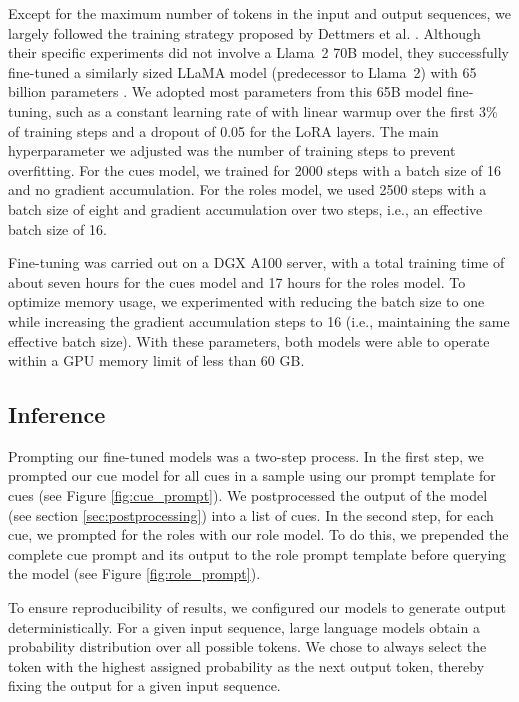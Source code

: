 \documentclass[11pt,a4paper]{article}
\begin{document}
Except for the maximum number of tokens in the input and output sequences, we largely followed the training strategy proposed by Dettmers et al. \cite{Dettmers2023}.
Although their specific experiments did not involve a Llama~2 70B model, they successfully fine-tuned a similarly sized LLaMA model (predecessor to Llama~2) with 65 billion parameters \cite{Touvron2023a}.
We adopted most parameters from this 65B model fine-tuning, such as a constant learning rate of  with linear warmup over the first 3\% of training steps and a dropout of 0.05 for the LoRA layers.
The main hyperparameter we adjusted was the number of training steps to prevent overfitting.
For the cues model, we trained for 2000 steps with a batch size of 16 and no gradient accumulation.
For the roles model, we used 2500 steps with a batch size of eight and gradient accumulation over two steps, i.e., an effective batch size of 16.

Fine-tuning was carried out on a DGX A100 server, with a total training time of about seven hours for the cues model and 17 hours for the roles model.
To optimize memory usage, we experimented with reducing the batch size to one while increasing the gradient accumulation steps to 16 (i.e., maintaining the same effective batch size).
With these parameters, both models were able to operate within a GPU memory limit of less than 60 GB.

 
\subsection{Inference}
\label{sec:inference}

Prompting our fine-tuned models was a two-step process.
In the first step, we prompted our cue model for all cues in a sample using our prompt template for cues (see Figure \ref{fig:cue_prompt}).
We postprocessed the output of the model (see section \ref{sec:postprocessing}) into a list of cues.
In the second step, for each cue, we prompted for the roles with our role model.
To do this, we prepended the complete cue prompt and its output to the role prompt template before querying the model (see Figure \ref{fig:role_prompt}).

To ensure reproducibility of results, we configured our models to generate output deterministically. 
For a given input sequence, large language models obtain a probability distribution over all possible tokens. 
We chose to always select the token with the highest assigned probability as the next output token, thereby fixing the output for a given input sequence.
 
\end{document}

